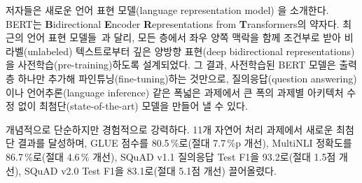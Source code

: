 저자들은 새로운 언어 표현 모델(language representation model) {\bf \bert}을 소개한다. BERT는 \textbf{B}idirectional \textbf{E}ncoder \textbf{R}epresentations from \textbf{T}ransformers의 약자다. 최근의 언어 표현 모델들~\cite{peters-etal:2018:_deep, radford-etal:2018}과 달리,  모든 층에서 좌우 양쪽 맥락을 함께 조건부로 받아 비라벨(unlabeled) 텍스트로부터 깊은 양방향 표현(deep bidirectional representations)을 사전학습(pre-training)하도록 설계되었다. 그 결과, 사전학습된 BERT 모델은 출력 층 하나만 추가해 파인튜닝(fine-tuning)하는 것만으로, 질의응답(question answering)이나 언어추론(language inference) 같은 폭넓은 과제에서 큰 폭의 과제별 아키텍처 수정 없이 최첨단(state-of-the-art) 모델을 만들어 낼 수 있다.

 개념적으로 단순하지만 경험적으로 강력하다. 11개 자연어 처리 과제에서 새로운 최첨단 결과를 달성하며, GLUE 점수를 80.5\,\%로(절대 7.7\,\%p 개선), MultiNLI 정확도를 86.7\,\%로(절대 4.6\,\% 개선), SQuAD v1.1 질의응답 Test F1을 93.2로(절대 1.5점 개선), SQuAD v2.0 Test F1을 83.1로(절대 5.1점 개선) 끌어올렸다.

